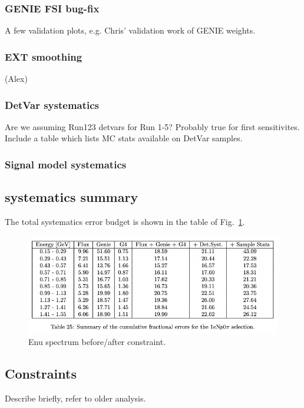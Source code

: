\documentclass{article}
\begin{document}
\subsubsection{GENIE FSI bug-fix} A few validation plots, e.g. Chris' validation work of GENIE weights.
\subsubsection{EXT smoothing} (Alex)
\subsubsection{DetVar systematics} Are we assuming Run123 detvars for Run 1-5? Probably true for first sensitivites. \\
Include a table which lists MC stats available on DetVar samples.
\subsubsection{Signal model systematics}

\subsection{systematics summary}

The total systematics error budget is shown in the table of Fig.~\ref{fig:systematicsbudget}.

\begin{center}
\begin{figure}[h]
    \includegraphics[width=1.00\textwidth]{technote/images/systematicsbudget.png}
    \caption{\label{fig:systematicsbudget} Enu spectrum before/after constraint.}
\end{figure}
\end{center}

\newpage
\subsection{Constraints}
Describe briefly, refer to older analysis.
\end{document}
